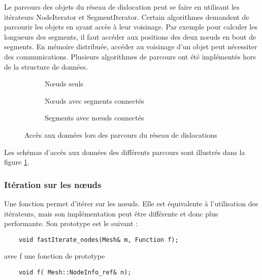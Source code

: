 Le parcours des objets du réseau de dislocation peut se faire en utilisant les itérateurs NodeIterator et SegmentIterator. Certain algorithmes demandent de parcourir les objets en ayant accès à leur voisinage. Par exemple pour calculer les longueurs des segments, il faut accéder aux positions des deux nœuds en bout de segments. En mémoire distribuée, accéder au voisinage d'un objet peut nécessiter des communications. Plusieurs algorithmes de parcours ont été implémentés hors de la structure de données.

\begin{figure}[H]
	\centering
	\begin{subfigure}[c]{0.3\textwidth}
		\centering
		\caption{Nœuds seuls}
	\end{subfigure}
	\begin{subfigure}[c]{0.3\textwidth}
		\centering
		\caption{\centering Nœuds avec segments connectés}
	\end{subfigure}
	\begin{subfigure}[c]{0.3\textwidth}
		\centering
		\caption{\centering Segments avec nœuds connectés}
	\end{subfigure}
	\caption{Accès aux données lors des parcours du réseau de dislocations}
	\label{fig:parcours_mesh}
\end{figure}

Les schémas d'accès aux données des différents parcours sont illustrés dans la figure \ref{fig:parcours_mesh}.


\subsubsection{Itération sur les nœuds}

Une fonction permet d'itérer sur les nœuds. Elle est équivalente à l'utilisation des itérateurs, mais son implémentation peut être différente et donc plus performante. Son prototype est le suivant : 

\begin{verbatim}
	void fastIterate_nodes(Mesh& m, Function f);
\end{verbatim}

avec f une fonction de prototype

\begin{verbatim}
	void f( Mesh::NodeInfo_ref& n);
\end{verbatim}

